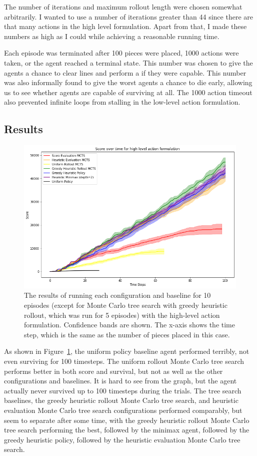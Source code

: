\documentclass[letterpaper]{article} %
\begin{document}
The number of iterations and maximum rollout length were chosen somewhat arbitrarily. I wanted to use a number of iterations greater than 44 since there are that many actions in the high level formulation. Apart from that, I made these numbers as high as I could while achieving a reasonable running time.

Each episode was terminated after 100 pieces were placed, 1000 actions were taken, or the agent reached a terminal state. This number was chosen to give the agents a chance to clear lines and perform a \tetris{} if they were capable. This number was also informally found to give the worst agents a chance to die early, allowing us to see whether agents are capable of surviving at all. The 1000 action timeout also prevented infinite loops from stalling in the low-level action formulation.

\subsection{Results}

\begin{figure}[t]
  \centering
  \includegraphics[width=\columnwidth]{HL.png}
  \caption{The results of running each configuration and baseline for 10 episodes (except for Monte Carlo tree search with greedy heuristic rollout, which was run for 5 episodes) with the high-level action formulation. Confidence bands are shown. The x-axis shows the time step, which is the same as the number of pieces placed in this case.}\label{fighl}
\end{figure}

As shown in Figure~\ref{fighl}, the uniform policy baseline agent performed terribly, not even surviving for 100 timesteps. The uniform rollout Monte Carlo tree search performs better in both score and survival, but not as well as the other configurations and baselines. It is hard to see from the graph, but the agent actually never survived up to 100 timesteps during the trials. The tree search baselines, the greedy heuristic rollout Monte Carlo tree search, and heuristic evaluation Monte Carlo tree search configurations performed comparably, but seem to separate after some time, with the greedy heuristic rollout Monte Carlo tree search performing the best, followed by the minimax agent, followed by the greedy heuristic policy, followed by the heuristic evaluation Monte Carlo tree search.
\end{document}
